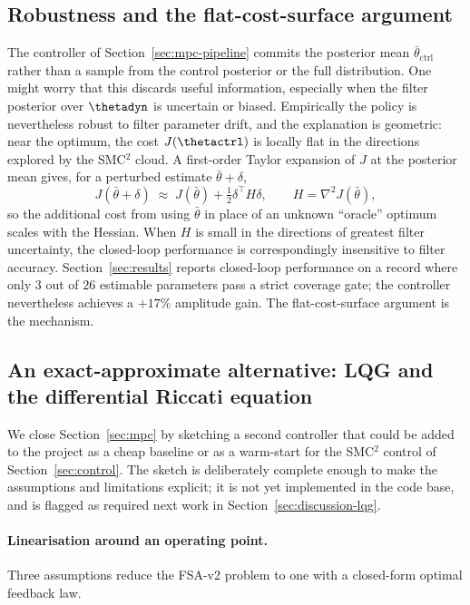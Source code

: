 \subsection{Robustness and the flat-cost-surface argument}\label{sec:mpc-robustness}

The controller of Section~\ref{sec:mpc-pipeline} commits the posterior
mean $\bar\theta_{\mathrm{ctrl}}$ rather than a sample from the control
posterior or the full distribution. One might worry that this discards
useful information, especially when the filter posterior over
$\thetadyn$ is uncertain or biased. Empirically the policy is
nevertheless robust to filter parameter drift, and the explanation is
geometric: near the optimum, the cost $J(\thetactrl)$ is locally flat in
the directions explored by the SMC${}^2$ cloud. A first-order Taylor
expansion of $J$ at the posterior mean gives, for a perturbed estimate
$\bar\theta + \delta$,
\begin{equation}
  J(\bar\theta + \delta)
   \;\approx\; J(\bar\theta) + \tfrac{1}{2}\delta^{\!\top} H \delta,
   \qquad H = \nabla^2 J(\bar\theta),
\end{equation}
so the additional cost from using $\bar\theta$ in place of an unknown
``oracle'' optimum scales with the Hessian. When $H$ is small in the
directions of greatest filter uncertainty, the closed-loop performance is
correspondingly insensitive to filter accuracy. Section~\ref{sec:results}
reports closed-loop performance on a record where only $3$ out of $26$
estimable parameters pass a strict coverage gate; the controller
nevertheless achieves a $+17\%$ amplitude gain. The flat-cost-surface
argument is the mechanism.

\subsection{An exact-approximate alternative: LQG and the differential
Riccati equation}\label{sec:mpc-lqg}

We close Section~\ref{sec:mpc} by sketching a second controller that
could be added to the project as a cheap baseline or as a warm-start for
the SMC${}^2$ control of Section~\ref{sec:control}. The sketch is
deliberately complete enough to make the assumptions and limitations
explicit; it is not yet implemented in the code base, and is flagged as
required next work in Section~\ref{sec:discussion-lqg}.

\paragraph{Linearisation around an operating point.}
Three assumptions reduce the FSA-v2 problem to one with a closed-form
optimal feedback law.

